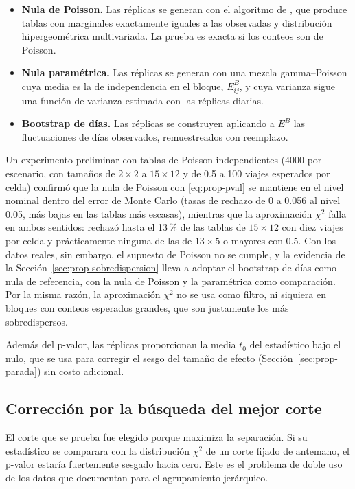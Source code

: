 \begin{itemize}
  \item \textbf{Nula de Poisson.} Las réplicas se generan con el algoritmo de
  \cite{Patefield1981}, que produce tablas con marginales exactamente iguales a
  las observadas y distribución hipergeométrica multivariada. La prueba es exacta
  si los conteos son de Poisson.
  \item \textbf{Nula paramétrica.} Las réplicas se generan con una mezcla
  gamma--Poisson cuya media es la de independencia en el bloque, $E^B_{ij}$, y
  cuya varianza sigue una función de varianza estimada con las réplicas diarias.
  \item \textbf{Bootstrap de días.} Las réplicas se construyen aplicando a
  $E^B$ las fluctuaciones de días observados, remuestreados con reemplazo.
\end{itemize}

Un experimento preliminar con tablas de Poisson independientes (4000 por
escenario, con tamaños de $2\times2$ a $15\times12$ y de 0.5 a 100 viajes
esperados por celda) confirmó que la nula de Poisson con
\eqref{eq:prop-pval} se mantiene en el nivel nominal dentro del error de Monte
Carlo (tasas de rechazo de 0 a 0.056 al nivel 0.05, más bajas en las tablas más
escasas), mientras que la aproximación $\chi^2$ falla en ambos sentidos: rechazó
hasta el 13\,\% de las tablas de $15\times12$ con diez viajes por celda y
prácticamente ninguna de las de $13\times5$ o mayores con 0.5.
Con los datos reales, sin embargo, el supuesto de Poisson no se cumple, y la
evidencia de la Sección~\ref{sec:prop-sobredispersion} lleva a adoptar el
bootstrap de días como nula de referencia, con la nula de Poisson y la
paramétrica como comparación. Por la misma razón, la aproximación $\chi^2$ no se
usa como filtro, ni siquiera en bloques con conteos esperados grandes, que son
justamente los más sobredispersos.

Además del p-valor, las réplicas proporcionan la media $\bar t_0$ del
estadístico bajo el nulo, que se usa para corregir el sesgo del tamaño de efecto
(Sección~\ref{sec:prop-parada}) sin costo adicional.

\subsection{Corrección por la búsqueda del mejor corte}\label{sec:prop-minP}

El corte que se prueba fue elegido porque maximiza la separación. Si su
estadístico se comparara con la distribución $\chi^2$ de un corte fijado de
antemano, el p-valor estaría fuertemente sesgado hacia cero. Este es el
problema de doble uso de los datos que \cite{Gao2024} documentan para el
agrupamiento jerárquico.

